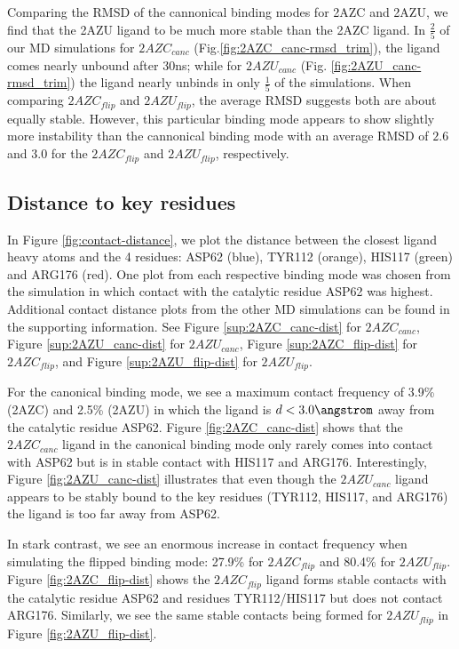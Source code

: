 Comparing the RMSD of the cannonical binding modes for 2AZC and 2AZU, we find that the 2AZU ligand to be much more stable than the 2AZC ligand.
In $\frac{2}{5}$ of our MD simulations for $2AZC_{canc}$ (Fig.\ref{fig:2AZC_canc-rmsd_trim}), the ligand comes nearly unbound after 30ns; while for $2AZU_{canc}$ (Fig. \ref{fig:2AZU_canc-rmsd_trim}) the ligand nearly unbinds in only $\frac{1}{5}$ of the simulations.
When comparing $2AZC_{flip}$ and $2AZU_{flip}$, the average RMSD suggests both are about equally stable.
However, this particular binding mode appears to show slightly more instability than the cannonical binding mode with an average RMSD of $2.6$ and $3.0$ for the $2AZC_{flip}$ and $2AZU_{flip}$, respectively.

\subsection{Distance to key residues}

In Figure \ref{fig:contact-distance}, we plot the distance between the closest ligand heavy atoms and the 4 residues: ASP62 (blue), TYR112 (orange), HIS117 (green) and ARG176 (red).
One plot from each respective binding mode was chosen from the simulation in which contact with the catalytic residue ASP62 was highest.
Additional contact distance plots from the other MD simulations can be found in the supporting information.
See Figure \ref{sup:2AZC_canc-dist} for $2AZC_{canc}$, Figure \ref{sup:2AZU_canc-dist} for $2AZU_{canc}$, Figure \ref{sup:2AZC_flip-dist} for $2AZC_{flip}$, and Figure \ref{sup:2AZU_flip-dist} for $2AZU_{flip}$.

For the canonical binding mode, we see a maximum contact frequency of 3.9\% (2AZC) and 2.5\% (2AZU) in which the ligand is $d<3.0\angstrom$ away from the catalytic residue ASP62.
Figure \ref{fig:2AZC_canc-dist} shows that the $2AZC_{canc}$ ligand in the canonical binding mode only rarely comes into contact with ASP62 but is in stable contact with HIS117 and ARG176.  
Interestingly, Figure \ref{fig:2AZU_canc-dist} illustrates that even though the $2AZU_{canc}$ ligand appears to be stably bound to the key residues (TYR112, HIS117, and ARG176) the ligand is too far away from ASP62.

In stark contrast, we see an enormous increase in contact frequency when simulating the flipped binding mode: 27.9\% for $2AZC_{flip}$ and 80.4\% for $2AZU_{flip}$.
Figure \ref{fig:2AZC_flip-dist} shows the $2AZC_{flip}$ ligand forms stable contacts with the catalytic residue ASP62 and residues TYR112/HIS117 but does not contact ARG176.
Similarly, we see the same stable contacts being formed for $2AZU_{flip}$ in Figure \ref{fig:2AZU_flip-dist}.

